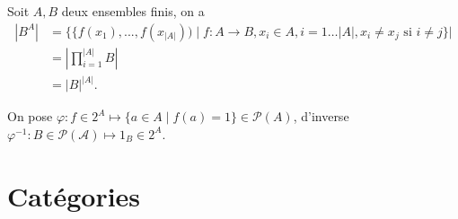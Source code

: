 \begin{exercice}
    Soit $A, B$ deux ensembles finis, on a 
    \begin{align*}
        |B^A| &= \{\{f(x_1),...,f(x_{|A|})) \mid f : A \to B, x_i \in A, i = 1\dots|A|, x_i \neq x_j \text{ si } i \neq j\}| \\
              &= \left|\prod_{i=1}^{|A|} B\right| \\
              &= |B|^{|A|}.
    \end{align*}
\end{exercice}

\begin{exercice}
    On pose $\varphi : f \in 2^A \mapsto \{a \in A \mid f(a) = 1\} \in \mathcal{P}(A)$, d'inverse $\varphi^{-1} : B \in \mathcal{P(A)} \mapsto 1_B \in 2^A$.
\end{exercice}

\section{Catégories}